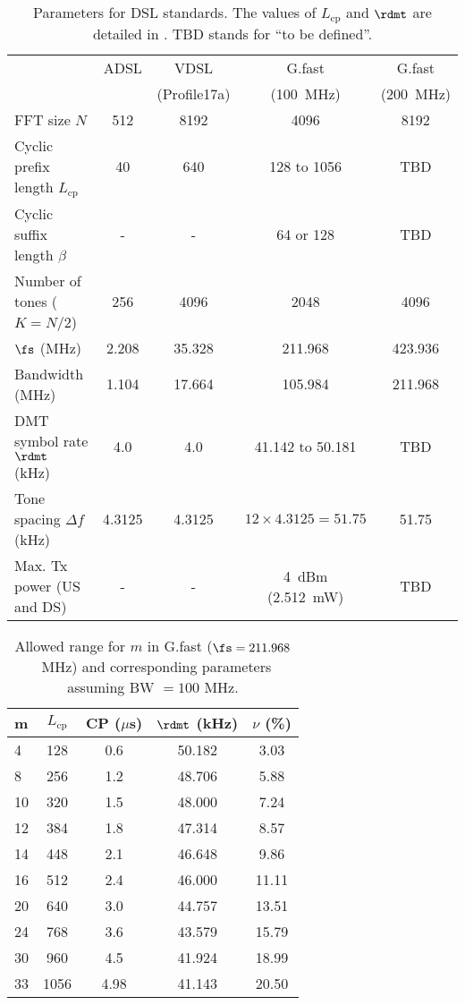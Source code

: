 \begin{table}
\centering
\caption{Parameters for DSL standards. The values of $L_{\textrm{cp}}$ and $\rdmt$ are detailed in . TBD stands for ``to be defined''. \label{tab:dsl_parameters}}
\begin{tabular}{|l|c|c|c|c|}
\hline
&  ADSL & VDSL  & G.fast   & G.fast \\ 
&  & (Profile17a) & (100~MHz)  & (200~MHz) \\ \hline
FFT size $N$ & 512 & 8192 & 4096 & 8192 \\ \hline
Cyclic prefix length $L_{\textrm{cp}}$ & 40 & 640 &  128 to 1056 & TBD \\ \hline
Cyclic suffix length $\beta$ & - & - &  64 or 128 & TBD \\ \hline
Number of tones ($K=N/2$) & 256  &  4096 &  2048 & 4096 \\ \hline
$\fs$ (MHz) & 2.208 & 35.328 &  211.968 & 423.936\\ \hline
Bandwidth (MHz) & 1.104 & 17.664 & 105.984 & 211.968 \\ \hline
DMT symbol rate $\rdmt$ (kHz) & 4.0 & 4.0 & 41.142 to 50.181 & TBD \\ \hline
Tone spacing $\Delta f$ (kHz) & 4.3125 & 4.3125 & $12 \times 4.3125 = 51.75$ & 51.75 \\ \hline
Max. Tx power (US and DS) & - & - & 4~dBm (2.512~mW) & TBD \\ \hline
\end{tabular}
\end{table}


\begin{table}
\centering
\caption{Allowed range for $m$ in G.fast ($\fs=211.968$~MHz) and corresponding parameters assuming BW $=100$ MHz.\label{tab:cp}}
\begin{tabular}{|l|c|c|c|c|}
\hline
m & $L_{\textrm{cp}}$ & CP ($\mu$s) & $\rdmt$ (kHz) & $\nu$ (\%) \\ \hline
4 & 128 & 0.6 & 50.182 & 3.03\\ \hline
8 & 256 & 1.2 & 48.706 &  5.88\\ \hline
10 & 320 & 1.5 &  48.000 & 7.24\\ \hline
12 & 384 & 1.8 & 47.314 &  8.57\\ \hline
14 & 448 & 2.1 & 46.648 &  9.86\\ \hline
16 & 512 & 2.4 & 46.000 &  11.11\\ \hline
20 & 640 & 3.0 & 44.757 &  13.51\\ \hline
24 & 768 & 3.6 & 43.579 &  15.79\\ \hline     
30 & 960 & 4.5 & 41.924 &  18.99\\ \hline     
33 & 1056 & 4.98 & 41.143 &  20.50\\ \hline     
\end{tabular}
\end{table}
   
